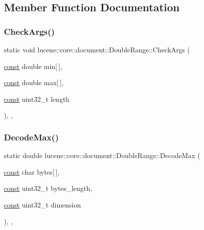 \subsection{Member Function Documentation}
\mbox{\label{classlucene_1_1core_1_1document_1_1DoubleRange_a10f3d27b685db535202452f5ba8693b9}} 
\subsubsection{\texorpdfstring{Check\+Args()}{CheckArgs()}}
{\footnotesize\ttfamily static void lucene\+::core\+::document\+::\+Double\+Range\+::\+Check\+Args (\begin{DoxyParamCaption}\item[{\mbox{\hyperlink{ZlibCrc32_8h_a2c212835823e3c54a8ab6d95c652660e}{const}} double}]{min\mbox{[}$\,$\mbox{]},  }\item[{\mbox{\hyperlink{ZlibCrc32_8h_a2c212835823e3c54a8ab6d95c652660e}{const}} double}]{max\mbox{[}$\,$\mbox{]},  }\item[{\mbox{\hyperlink{ZlibCrc32_8h_a2c212835823e3c54a8ab6d95c652660e}{const}} uint32\+\_\+t}]{length }\end{DoxyParamCaption})\hspace{0.3cm}{\ttfamily [inline]}, {\ttfamily [static]}, {\ttfamily [private]}}

\mbox{\label{classlucene_1_1core_1_1document_1_1DoubleRange_ad344a7b94c98b695feae8728ddc0de63}} 
\subsubsection{\texorpdfstring{Decode\+Max()}{DecodeMax()}}
{\footnotesize\ttfamily static double lucene\+::core\+::document\+::\+Double\+Range\+::\+Decode\+Max (\begin{DoxyParamCaption}\item[{\mbox{\hyperlink{ZlibCrc32_8h_a2c212835823e3c54a8ab6d95c652660e}{const}} char}]{bytes\mbox{[}$\,$\mbox{]},  }\item[{\mbox{\hyperlink{ZlibCrc32_8h_a2c212835823e3c54a8ab6d95c652660e}{const}} uint32\+\_\+t}]{bytes\+\_\+length,  }\item[{\mbox{\hyperlink{ZlibCrc32_8h_a2c212835823e3c54a8ab6d95c652660e}{const}} uint32\+\_\+t}]{dimension }\end{DoxyParamCaption})\hspace{0.3cm}{\ttfamily [inline]}, {\ttfamily [static]}, {\ttfamily [noexcept]}}

